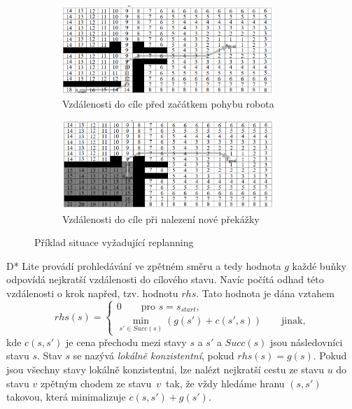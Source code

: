\begin{figure}[htb]
	\centering
	\begin{subfigure}{.5\textwidth}
		\centering
		\includegraphics[width=8cm]{obr/dStarA}
		\caption{\centering Vzdálenosti do cíle před \linebreak začátkem pohybu robota}
		\label{obr:D*a}
	\end{subfigure}%
	\begin{subfigure}{.5\textwidth}
		\centering
		\includegraphics[width=8cm]{obr/dStarB}
		\caption{\centering Vzdálenosti do cíle při \linebreak nalezení nové překážky}
		\label{obr:D*b}
	\end{subfigure}
	\vspace*{4mm}
	\caption{Příklad situace vyžadující replanning \cite{Koenig2002}}
	\label{obr:D*}
\end{figure}

D* Lite provádí prohledávání ve zpětném směru a tedy hodnota $g$ každé buňky odpovídá nejkratší vzdálenosti do cílového stavu. Navíc počítá odhad této vzdálenosti o krok napřed, tzv. hodnotu $rhs$. Tato hodnota je dána vztahem
\begin{equation}
rhs(s)=\begin{cases}
0 \qquad \text{pro } s=s_{start},\\
\min_{s'\in Succ(s)}\left(g\left(s'\right)+c\left(s',s\right)\right) \qquad \text{jinak},
\end{cases}
\end{equation}
kde $c(s,s')$ je cena přechodu mezi stavy $s$ a $s'$ a $Succ(s)$ jsou následovníci stavu $s$. Stav $s$ se nazývá \emph{lokálně konzistentní}, pokud $rhs(s)=g(s)$. Pokud jsou všechny stavy lokálně konzistentní, lze nalézt nejkratší cestu ze stavu $u$ do stavu $v$ zpětným chodem ze stavu~$v$~tak, že vždy hledáme hranu $(s,s')$ takovou, která minimalizuje $c(s,s')+g(s')$.

